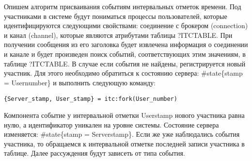 Опишем алгоритм присваивания событиям интервальных отметок времени. Под участниками в системе будут пониматься процессы пользователей, которые идентифицируются следующими свойствами: соединение с брокером (connection) и канал (channel), которые являются атрибутами таблицы ?ITC\underline{\hspace{0.25cm}}TABLE. При получении сообщения из его заголовка будет извлечена информация о соединении и канале и будет произведен поиск событий, соответствующих этим значениям, в таблице ?ITC\underline{\hspace{0.25cm}}TABLE. В случае если события не найдены, регистрируется новый участник. Для этого необходимо обратиться к состоянию сервера: \#state\{stamp = User\underline{\hspace{0.25cm}}number\} и выполнить следующую команду:
\begin{lstlisting}
{Server_stamp, User_stamp} = itc:fork(User_number)
\end{lstlisting}
Компонента событие у интервальной отметки User\underline{\hspace{0.25cm}}stamp нового участника равна нулю, а идентификатор уникален на уровне системы. Состояние сервера изменяется: \#state\{stamp = Server\underline{\hspace{0.25cm}}stamp\}. Если же уже наблюдались события участника, то обращаемся к интервальной отметке последней записи участника в таблице. Далее рассуждения будут зависеть от типа события.

